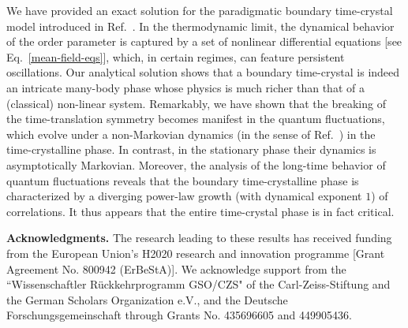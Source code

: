 \documentclass[prl,superscriptaddress,showpacs,longbibliography,reprint]{revtex4-2}
\begin{document}
 We have provided an exact solution for the paradigmatic boundary time-crystal model introduced in Ref.~\cite{iemini2018}. In the thermodynamic limit, the dynamical behavior of the order parameter is captured by a set of nonlinear differential equations [see Eq.~\eqref{mean-field-eqs}], which, in certain regimes, can feature persistent oscillations. Our analytical solution shows that a boundary time-crystal is indeed an intricate many-body phase whose physics is much richer than that of a (classical) non-linear system. Remarkably, we have shown that the breaking of the time-translation symmetry becomes manifest in the quantum fluctuations, which evolve under a non-Markovian dynamics (in the sense of Ref.~\cite{chruscinski2010}) in the time-crystalline phase. In contrast, in the stationary phase their dynamics is asymptotically Markovian. Moreover, the analysis of the long-time behavior of quantum fluctuations reveals that the boundary time-crystalline phase is characterized by a diverging power-law growth (with dynamical exponent $1$) of correlations. It thus appears that the entire time-crystal phase is in fact critical.
\\
\begin{acknowledgements}
\noindent \textbf{Acknowledgments.} The research leading to these results has received funding from the European Union’s H2020 research and innovation programme [Grant Agreement No. 800942 (ErBeStA)]. We acknowledge support from the ``Wissenschaftler R\"{u}ckkehrprogramm GSO/CZS" of the Carl-Zeiss-Stiftung and the German Scholars Organization e.V., and the Deutsche Forschungsgemeinschaft through Grants No. 435696605 and 449905436. 
\end{acknowledgements}
\let\oldaddcontentsline\addcontentsline%
\renewcommand{\addcontentsline}[3]{}%

\let\addcontentsline\oldaddcontentsline%



\newpage

\renewcommand\thesection{S\arabic{section}}
\renewcommand\theequation{S\arabic{equation}}
\renewcommand\thefigure{S\arabic{figure}}
\setcounter{equation}{0}
\setcounter{figure}{0}

\onecolumngrid
\end{document}
